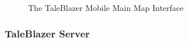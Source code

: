 \medskip
\begin{figure}[htb]
	\caption[TaleBlazer Mobile Map UI]{\label{fig:app_ui} The TaleBlazer Mobile Main Map Interface}
\end{figure}

\subsubsection{TaleBlazer Server}

